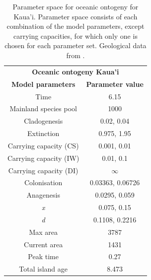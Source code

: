 \begin{table}[ht]
    \centering
    \caption{Parameter space for oceanic ontogeny for Kaua'i. Parameter space consists of each combination of the model parameters, except carrying capacities, for which only one is chosen for each parameter set.  Geological data from \cite{lim_true_2017}.}
    \begin{tabular}{ c | c }
        \multicolumn{2}{c}{\textbf{Oceanic ontogeny Kaua'i}} \\
        \textbf{Model parameters} & \textbf{Parameter value} \\ 
        \hline
        \hline
        Time & 6.15 \\
        \hline
        Mainland species pool & 1000 \\
        \hline
        Cladogenesis & 0.02, 0.04 \\
        \hline
        Extinction & 0.975, 1.95 \\
        \hline
        Carrying capacity (CS) & 0.001, 0.01 \\
        \hline
        Carrying capacity (IW) & 0.01, 0.1 \\
        \hline
        Carrying capacity (DI) & $\infty$ \\
        \hline
        Colonisation & 0.03363, 0.06726 \\
        \hline
        Anagenesis & 0.0295, 0.059 \\
        \hline
        \textit{x} & 0.075, 0.15 \\
        \hline
        \textit{d} & 0.1108, 0.2216 \\
        \hline
        Max area & 3787 \\
        \hline
        Current area & 1431 \\
        \hline
        Peak time & 0.27 \\
        \hline
        Total island age & 8.473 \\
    \end{tabular}
    \label{tab:oceanic_ontogeny_old}
\end{table}


